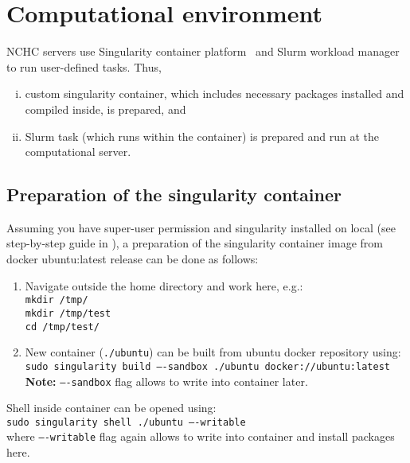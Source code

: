 \cleardoublepage
\section{Computational environment}
\label{sec:env}

NCHC servers use Singularity container platform~\cite{singularity} and Slurm workload manager~\cite{slurm} to run user-defined tasks. Thus,  
\begin{enumerate}[(i)]
    \item custom singularity container, which includes necessary packages installed and compiled inside, is prepared, and
    \item Slurm task (which runs within the container) is prepared and run at the computational server.
\end{enumerate}

\subsection{Preparation of the singularity container}
\label{subsec:prepCont}

Assuming you have super-user permission and singularity installed on local (see step-by-step guide in \cite{singularityInstall}), a preparation of the singularity container image from docker ubuntu:latest release can be done as follows: 
\begin{enumerate}
    \item Navigate outside the home directory and work here, e.g.: \\[0.2cm] 
    \texttt{mkdir /tmp/} \\[0.2cm] 
    \texttt{mkdir /tmp/test} \\[0.2cm] 
    \texttt{cd /tmp/test/} 
    \item New container (\texttt{./ubuntu}) can be built from ubuntu docker repository using:\\[0.2cm] 
    \texttt{sudo singularity build ----sandbox ./ubuntu docker://ubuntu:latest}\\[0.2cm] 
    \textbf{Note:} \texttt{----sandbox} flag allows to write into container later.
\end{enumerate}

Shell inside container can be opened using: \\[0.2cm]
\indent\quad\quad\texttt{sudo singularity shell ./ubuntu ----writable} \\[0.2cm]
where \texttt{----writable} flag again allows to write into container and install packages here.

